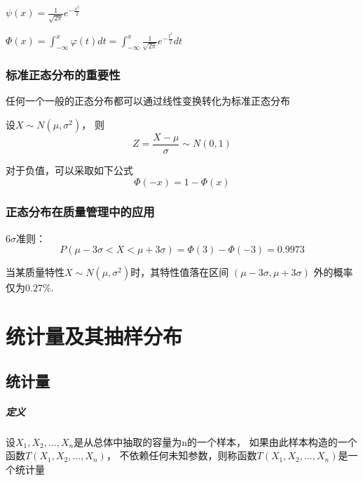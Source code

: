 \documentclass[UTF8,10pt]{book}
\begin{document}
                $   \psi(x) =  \frac{1}{\sqrt{2\pi}} e^{-\frac{x^2}{2} }  $

                $   \Phi(x) = \int_{-\infty}^x \varphi(t) dt 
                = \int_{-\infty}^x \frac{1}{\sqrt{2\pi}} e^{-\frac{t^2}{2} } dt   $
            
            \subsection{标准正态分布的重要性}
                任何一个一般的正态分布都可以通过线性变换转化为标准正态分布

                设$X\sim N(\mu,\sigma^2) $， 则
                $$ Z = \frac{X-\mu}{\sigma} \sim N(0,1)$$

                对于负值，可以采取如下公式
                $$ \Phi(-x) = 1-\Phi(x) $$

            \subsection{正态分布在质量管理中的应用}
                $6\sigma$准则：
                $$ P(\mu - 3\sigma < X < \mu+3\sigma)
                = \Phi(3) - \Phi(-3)
                = 0.9973 $$

                {\kaishu 当某质量特性$X\sim N(\mu,\sigma^2) $时，其特性值落在区间 $(\mu-3\sigma,\mu+3\sigma)$
                外的概率仅为$0.27\%$.}



\clearpage
\chapter{统计量及其抽样分布}


    \section{统计量}
        \paragraph{定义} 设$X_1,X_2,...,X_n$是从总体中抽取的容量为n的一个样本，
        如果由此样本构造的一个函数$T(X_1,X_2,...,X_n)$，
        不依赖任何未知参数，则称函数$T(X_1,X_2,...,X_n)$是一个统计量
		
\end{document}
